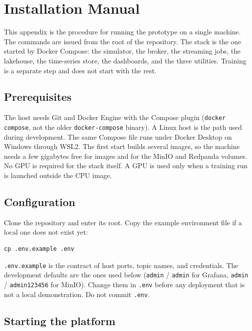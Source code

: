 \appendix

\chapter{Installation Manual}
\label{app:installation_manual}

This appendix is the procedure for running the prototype on a single machine. The commands are issued from the root of the repository. The stack is the one started by Docker Compose: the simulator, the broker, the streaming jobs, the lakehouse, the time-series store, the dashboards, and the three utilities. Training is a separate step and does not start with the rest.

\section{Prerequisites}

The host needs Git and Docker Engine with the Compose plugin (\texttt{docker compose}, not the older \texttt{docker-compose} binary). A Linux host is the path used during development. The same Compose file runs under Docker Desktop on Windows through WSL2. The first start builds several images, so the machine needs a few gigabytes free for images and for the MinIO and Redpanda volumes. No GPU is required for the stack itself. A GPU is used only when a training run is launched outside the CPU image.

\section{Configuration}

Clone the repository and enter its root. Copy the example environment file if a local one does not exist yet:

\begin{lstlisting}[basicstyle=\ttfamily\small,breaklines=true]
cp .env.example .env
\end{lstlisting}

\texttt{.env.example} is the contract of host ports, topic names, and credentials. The development defaults are the ones used below (\texttt{admin} / \texttt{admin} for Grafana, \texttt{admin} / \texttt{admin123456} for MinIO). Change them in \texttt{.env} before any deployment that is not a local demonstration. Do not commit \texttt{.env}.

\section{Starting the platform}

